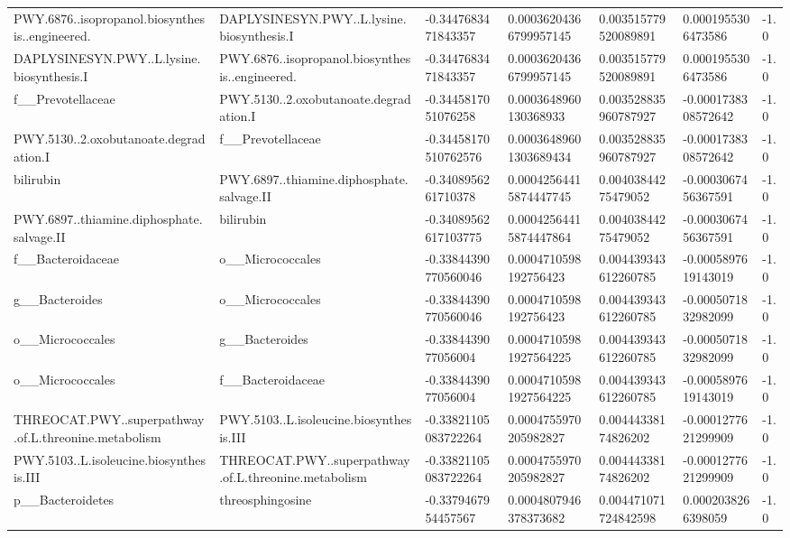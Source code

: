 \begin{longtable}{lllllll}
PWY.6876..isopropanol.biosynthesis..engineered. & DAPLYSINESYN.PWY..L.lysine.biosynthesis.I & -0.3447683471843357 & 0.00036204366799957145 & 0.003515779520089891 & 0.0001955306473586 & -1.0 \\
DAPLYSINESYN.PWY..L.lysine.biosynthesis.I & PWY.6876..isopropanol.biosynthesis..engineered. & -0.3447683471843357 & 0.00036204366799957145 & 0.003515779520089891 & 0.0001955306473586 & -1.0 \\
f\_\_Prevotellaceae & PWY.5130..2.oxobutanoate.degradation.I & -0.3445817051076258 & 0.0003648960130368933 & 0.003528835960787927 & -0.0001738308572642 & -1.0 \\
PWY.5130..2.oxobutanoate.degradation.I & f\_\_Prevotellaceae & -0.34458170510762576 & 0.00036489601303689434 & 0.003528835960787927 & -0.0001738308572642 & -1.0 \\
bilirubin & PWY.6897..thiamine.diphosphate.salvage.II & -0.3408956261710378 & 0.00042564415874447745 & 0.00403844275479052 & -0.0003067456367591 & -1.0 \\
PWY.6897..thiamine.diphosphate.salvage.II & bilirubin & -0.34089562617103775 & 0.00042564415874447864 & 0.00403844275479052 & -0.0003067456367591 & -1.0 \\
f\_\_Bacteroidaceae & o\_\_Micrococcales & -0.33844390770560046 & 0.0004710598192756423 & 0.004439343612260785 & -0.0005897619143019 & -1.0 \\
g\_\_Bacteroides & o\_\_Micrococcales & -0.33844390770560046 & 0.0004710598192756423 & 0.004439343612260785 & -0.0005071832982099 & -1.0 \\
o\_\_Micrococcales & g\_\_Bacteroides & -0.3384439077056004 & 0.00047105981927564225 & 0.004439343612260785 & -0.0005071832982099 & -1.0 \\
o\_\_Micrococcales & f\_\_Bacteroidaceae & -0.3384439077056004 & 0.00047105981927564225 & 0.004439343612260785 & -0.0005897619143019 & -1.0 \\
THREOCAT.PWY..superpathway.of.L.threonine.metabolism & PWY.5103..L.isoleucine.biosynthesis.III & -0.33821105083722264 & 0.0004755970205982827 & 0.00444338174826202 & -0.0001277621299909 & -1.0 \\
PWY.5103..L.isoleucine.biosynthesis.III & THREOCAT.PWY..superpathway.of.L.threonine.metabolism & -0.33821105083722264 & 0.0004755970205982827 & 0.00444338174826202 & -0.0001277621299909 & -1.0 \\
p\_\_Bacteroidetes & threosphingosine & -0.3379467954457567 & 0.0004807946378373682 & 0.004471071724842598 & 0.0002038266398059 & -1.0 \\

\end{longtable}
